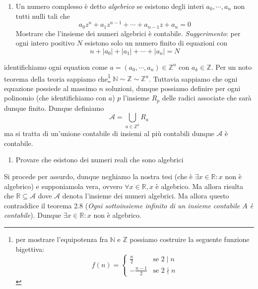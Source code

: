 \documentclass{report}
\begin{document}
\begin{enumerate}[resume, label=\protect\circled{\arabic*}]
	\item Un numero complesso è detto \emph{algebrico} se esistono degli interi $a_0, \cdots , a_n$ non tutti nulli tali che
	$$
		a_0z^n + a_1 z^{n-1} + \cdots + a_{n-1}z + a_n = 0
	$$
	Mostrare che l'insieme dei numeri algebrici è contabile. \textit{Suggerimento}: per ogni intero positivo $N$ esistono solo un numero finito di equazioni con
	$$
		n + |a_0| + |a_1| + \cdots + |a_n| = N
	$$
\end{enumerate}
\begin{mysolution}
	identifichiamo ogni equation come $a = (a_0, \cdots , a_n) \in \mathbb{Z}^n$ con $a_k \in \mathbb{Z}$. Per un noto teorema della teoria sappiamo che\footnote{per mostrare l'equipotenza fra $\mathbb{N}$ e $\mathbb{Z}$ possiamo costruire la seguente funzione bigettiva: \begin{equation*}
	f(n) = \begin{cases} \frac{n}{2} & \text{se } 2 \mid n \\ -\frac{n-1}{2} & \text{se } 2 \nmid n \end{cases}	
\end{equation*}
} $\mathbb{N} \sim \mathbb{Z} \sim \mathbb{Z}^n$. Tuttavia sappiamo che ogni equazione possiede al massimo $n$ soluzioni, dunque possiamo definire per ogni polinomio (che identifichiamo con $a$) $p$ l'insieme $R_p$ delle radici associate che sarà dunque finito. Dunque definiamo $$\mathcal{A} = \bigcup_{a \in \mathbb{Z}^k} R_a$$ ma si tratta di un'unione contabile di insiemi al più contabili dunque $\mathcal{A}$ è contabile.
\end{mysolution}
\begin{enumerate}[resume, label=\protect\circled{\arabic*}]
	\item Provare che esistono dei numeri reali che sono algebrici
\end{enumerate}
\begin{mysolution}
	Si procede per assurdo, dunque neghiamo la nostra tesi (che è $\exists x \in \mathbb{R}: x$ non è algebrico) e supponiamola vera, ovvero $\forall x \in \mathbb{R}, x$ è algebrico. Ma allora risulta che $\mathbb{R} \subseteq \mathcal{A}$ dove $\mathcal{A}$ denota l'insieme dei numeri algebrici. Ma allora questo contraddice il teorema 2.8 (\emph{Ogni sottoinsieme infinito di un insieme contabile $A$ è contabile}). Dunque $\exists x \in \mathbb{R}: x$ non è algebrico.
\end{mysolution}
\end{document}
